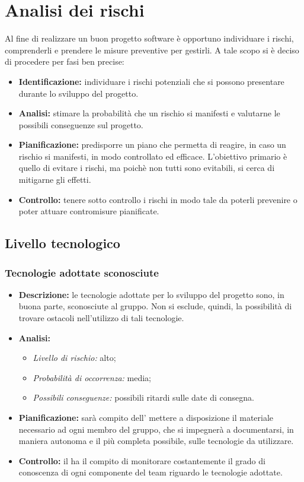 \section{Analisi dei rischi}
	Al fine di realizzare un buon progetto software è opportuno individuare i rischi, comprenderli e prendere le misure preventive per gestirli. A tale scopo si è deciso di procedere per fasi ben precise:
	\begin{itemize}
		\item \textbf{Identificazione:} individuare i rischi potenziali che si possono presentare durante lo sviluppo del progetto.
		\item \textbf{Analisi:} stimare la probabilità che un rischio si manifesti e valutarne le possibili conseguenze sul progetto.
		\item \textbf{Pianificazione:} predisporre un piano che permetta di reagire, in caso un rischio si manifesti, in modo controllato ed efficace. L'obiettivo primario è quello di evitare i rischi, ma poichè non tutti sono evitabili, si cerca di mitigarne gli effetti.
		\item \textbf{Controllo:} tenere sotto controllo i rischi in modo tale da poterli prevenire o poter attuare contromisure pianificate.
	\end{itemize}
	\subsection{Livello tecnologico}
		\subsubsection{Tecnologie adottate sconosciute}
			\begin{itemize}
				\item \textbf{Descrizione:} le tecnologie adottate per lo sviluppo del progetto sono, in buona parte, sconosciute al gruppo. Non si esclude, quindi, la possibilità di trovare ostacoli nell'utilizzo di tali tecnologie.
				\item \textbf{Analisi:}
					\begin{itemize}
						\item \textit{Livello di rischio:} alto;
						\item \textit{Probabilità di occorrenza:} media;
						\item \textit{Possibili conseguenze:} possibili ritardi sulle date di consegna.
					\end{itemize}
				\item \textbf{Pianificazione:} sarà compito dell' mettere a disposizione il materiale necessario ad ogni membro del gruppo, che si impegnerà a documentarsi, in maniera autonoma e il più completa possibile, sulle tecnologie da utilizzare.
				\item \textbf{Controllo:} il  ha il compito di monitorare costantemente il grado di conoscenza di ogni componente del team riguardo le tecnologie adottate.
			\end{itemize}
